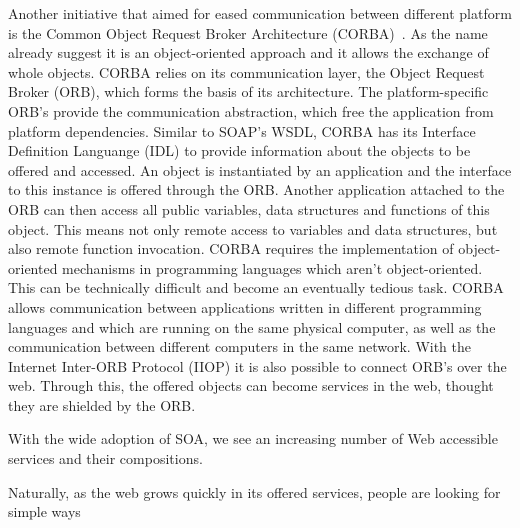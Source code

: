 Another initiative that aimed for eased communication between different platform is the Common Object Request Broker Architecture (CORBA)~\cite{dec1991common}.
As the name already suggest it is an object-oriented approach and it allows the exchange of whole objects.
CORBA relies on its communication layer, the Object Request Broker (ORB), which forms the basis of its architecture.
The platform-specific ORB's provide the communication abstraction, which free the application from platform dependencies.
Similar to SOAP's WSDL, CORBA has its Interface Definition Languange (IDL) to provide information about the objects to be offered and accessed.
An object is instantiated by an application and the interface to this instance is offered through the ORB.
Another application attached to the ORB can then access all public variables, data structures and functions of this object.
This means not only remote access to variables and data structures, but also remote function invocation.
CORBA requires the implementation of object-oriented mechanisms in programming languages which aren't object-oriented.
This can be technically difficult and become an eventually tedious task.
CORBA allows communication between applications written in different programming languages and which are running on the same physical computer, as well as the communication between different computers in the same network.
With the Internet Inter-ORB Protocol (IIOP) it is also possible to connect ORB's over the web.
Through this, the offered objects can become services in the web, thought they are shielded by the ORB.

With the wide adoption of SOA, we see an increasing number of Web accessible services and their compositions.~\cite{conf/icws/HuangFT12}


Naturally, as the web grows quickly in its offered services, people are looking for simple ways



